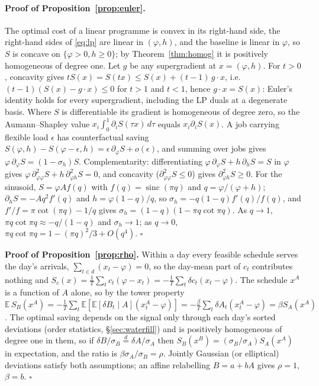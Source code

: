 \documentclass[acmsmall,review,anonymous]{acmart}
\theoremstyle{definition}
\newcommand{\sinc}{\operatorname{sinc}}
\begin{document}
\paragraph{Proof of Proposition~\ref{prop:euler}.} The optimal cost of a linear programme is
convex in its right-hand side, the right-hand sides of \eqref{eq:lp} are linear in
$(\varphi,h)$, and the baseline is linear in $\varphi$, so $S$ is concave on $\{\varphi>0,h\ge0\}$;
by Theorem~\ref{thm:homog} it is positively homogeneous of degree one. Let $g$ be any
supergradient at $x=(\varphi,h)$. For $t>0$, concavity gives $tS(x)=S(tx)\le S(x)+(t-1)\,g\cdot x$,
i.e.\ $(t-1)(S(x)-g\cdot x)\le0$ for $t>1$ and $t<1$, hence $g\cdot x=S(x)$: Euler's identity holds
for every supergradient, including the LP duals at a degenerate basis. Where $S$ is
differentiable its gradient is homogeneous of degree zero, so the Aumann--Shapley value
$x_i\int_0^1\partial_iS(\tau x)\,d\tau$ equals $x_i\partial_iS(x)$. A job carrying flexible load
$\epsilon$ has counterfactual saving $S(\varphi,h)-S(\varphi-\epsilon,h)=\epsilon\,\partial_\varphi S+o(\epsilon)$,
and summing over jobs gives $\varphi\,\partial_\varphi S=(1-\sigma_h)S$. Complementarity: differentiating
$\varphi\,\partial_{\varphi}S+h\,\partial_{h}S=S$ in $\varphi$ gives
$\varphi\,\partial^2_{\varphi\varphi}S+h\,\partial^2_{\varphi h}S=0$, and concavity
($\partial^2_{\varphi\varphi}S\le0$) gives $\partial^2_{\varphi h}S\ge0$. For the sinusoid,
$S=\varphi A f(q)$ with $f(q)=\sinc(\pi q)$ and $q=\varphi/(\varphi+h)$; $\partial_hS=-Aq^2f'(q)$ and
$h=\varphi(1-q)/q$, so $\sigma_h=-q(1-q)f'(q)/f(q)$, and $f'/f=\pi\cot(\pi q)-1/q$ gives
$\sigma_h=(1-q)(1-\pi q\cot\pi q)$. As $q\to1$, $\pi q\cot\pi q\approx-q/(1-q)$ and $\sigma_h\to1$; as
$q\to0$, $\pi q\cot\pi q=1-(\pi q)^2/3+O(q^4)$. \hfill$\square$

\textbf{Proof of Proposition~\ref{prop:rho}.} Within a day every feasible schedule serves the
day's arrivals, $\sum_{t\in d}(x_t-\varphi)=0$, so the day-mean part of $c_t$ contributes nothing and
$S_c(x)=\frac1T\sum_t c_t(\varphi-x_t)=-\frac1T\sum_t\delta c_t(x_t-\varphi)$. The schedule $x^A$
is a function of $A$ alone, so by the tower property
$\mathbb{E}\,S_B(x^A)=-\frac1T\sum_t\mathbb{E}[\mathbb{E}[\delta B_t\mid A](x^A_t-\varphi)]
=-\frac{\beta}{T}\sum_t\delta A_t(x^A_t-\varphi)=\beta S_A(x^A)$. The optimal saving depends on the
signal only through each day's sorted deviations (order statistics, \S\ref{sec:waterfill}) and is
positively homogeneous of degree one in them, so if $\delta B/\sigma_B\overset{d}{=}\delta A/\sigma_A$
then $S_B(x^B)=(\sigma_B/\sigma_A)S_A(x^A)$ in expectation, and the ratio is
$\beta\sigma_A/\sigma_B=\rho$. Jointly Gaussian (or elliptical) deviations satisfy both
assumptions; an affine relabelling $B=a+bA$ gives $\rho=1$, $\beta=b$. \hfill$\square$


\end{document}

